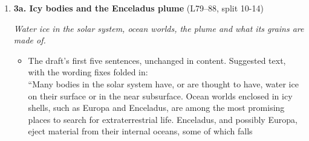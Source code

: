 \documentclass[11pt]{article}
\newcommand{\Pg}[3]{\item \textbf{#1} {\small(#2)}\par\textit{#3}}
\newcommand{\tC}{\textcolor{miss}{\textbf{[correct]}}\ }
\newcommand{\tG}{\textcolor{stale}{\textbf{[wording]}}\ }
\newcommand{\tA}{\textcolor{have}{\textbf{[add]}}\ }
\newcommand{\add}[1]{\textcolor{revB}{#1}}
\begin{document}
\begin{enumerate}
\begin{itemize}
  \item \tA In its place, why bulk conductivity matters for large icy
    systems, e.g.\ ``The effective thermal conductivity of snow, firn and
    porous ice sets how fast heat crosses them and so the temperature profile
    within them (Calonne et al., 2011, 2019), and it is an input of the
    detailed snowpack models used to follow their evolution (Lehning et al.,
    2002; Vionnet et al., 2012).'' All four are in the \texttt{.bib}; check
    each claim against the paper.
  \item \add{\tC Depth-hoar sentence: drop \texttt{colbeckSinteringDrySnow1998} (bond growth, no depth hoar); Fukuzawa \& Akitaya
    and Schweizer et al.\ support it. ``drives slab avalanche initiation'' $\to$ ``forms weak layers on which slab avalanches
    release'' (Schweizer et al., p.1--2, list depth hoar with surface hoar and facets).}
  \item \add{\tG \texttt{ citet} prints mid-sentence names: use \texttt{\char92 citep}. Calonne et al.\
    (2019) carry the firn/temperature-profile part; 2011 is seasonal snow only.}
  \item \add{Adopted in the 10-15 draft: ``DSM is why''; permafrost clause removed.}
  \end{itemize}
\Pg{3a. Icy bodies and the Enceladus plume}{L79--88, split 10-14}{Water ice in the solar system, ocean worlds, the plume and what its grains are made of.}
  \begin{itemize}
  \item The draft's first five sentences, unchanged in content. Suggested
    text, with the wording fixes folded in:\\
    ``Many bodies in the solar system have, or are thought to have, water
    ice on their surface or in the near subsurface. Ocean worlds enclosed in
    icy shells, such as Europa and Enceladus, are among the most promising
    places to search for extraterrestrial life. Enceladus, and possibly
    Europa, eject material from their internal oceans, some of which falls

\end{itemize}
\end{enumerate}
\end{document}
